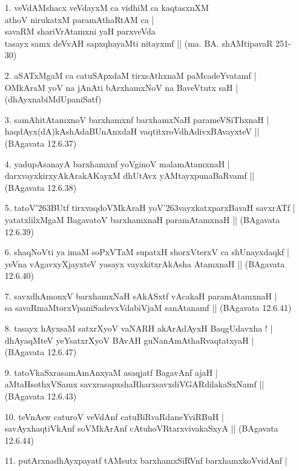 \begin{itemize}
\item[1.] veVdAMshacx veVdayxM ca vidhiM ca kaqtasxnXM\\\label{144}
athoV nirukatxM paramAthaRtAM ca |\\
savaRM shariVrAtamxni yaH parxveVda\\
tasayx samx deVvAH sapxqhayaMti nitayxmf ||
\hfill{(ma. BA. shAMtipavaR 251-30)}
\item[2.] aSATxMgaM ca catuSApxdaM tirxsAthxnaM paMcadeYvatamf |\\\label{144}
OMkAraM yoV na jAnAti bArxhamxNoV na BaveVtutx saH |
\hfill{(dhAyxnabiMdUpaniSatf)}
\item[3.] samAhitAtamxnoV barxhamxnf barxhamxNaH parameVSiThxnaH |\\\label{144}
haqdAyx(dA)kAshAdaBUnAnxdaH vaqtitxroVdhAdivxBAvayxteV ||
\hfill{(BAgavata 12.6.37)}
\item[4.] yadupAsanayA barxhamxnf yoVginoV malamAtamxnaH |\\
darxvayxkirxyAkArakAKayxM dhUtAvx yAMtayxpunaBaRvamf ||
\hfill{(BAgavata 12.6.38)}
\item[5.] tatoV\char'263BUtf tirxvaqdoVMkAraH yoV\char'263vayxkatxparxBavaH savxrATf |\\
yatatxlilxMgaM BagavatoV barxhamxnaH paramAtamxnaH ||
\hfill{(BAgavata 12.6.39)}
\item[6.] shaqNoVti ya imaM soPxVTaM supatxH shorxVterxV ca shUnayxdaqkf |\\
yeVna vAgavxyXjayxteV yasayx vayxkitxrAkAsha AtamxnaH ||
\hfill{(BAgavata 12.6.40)}
\item[7.] savxdhAmonxV barxhamxNaH sAkASxtf vAcakaH paramAtamxnaH |\\
sa savaRmaMtorxVpaniSadevxVdabiVjaM sanAtanamf ||
\hfill{(BAgavata 12.6.41)}
\item[8.] tasayx hAyxsaM satxrXyoV vaNARH akArAdAyxH BaqgUdavxha ! |\\
dhAyaqMteV yeYsatxrXyoV BAvAH guNanAmAthaRvaqtatxyaH |
\hfil{(BAgavata 12.6.47)}
\item[9.] tatoVkaSxrasamAmAnxyaM asaqjatf BagavAnf ajaH |\\
aMtaHsothxVSamx savxrasapxshaRharxsavxdiVGARdilakaSxNamf ||
\hfill{(BAgavata 12.6.43)}
\item[10.] teVnAsw caturoV veVdAnf catuBiRvaRdaneYviRBuH |\\
savAyxhaqtiVkAnf soVMkArAnf cAtuhoVRtarxvivakaSxyA ||
\hfill{(BAgavata 12.6.44)}
\item[11.] putArxnadhAyxpayatf tAMsutx barxhamxSiRVnf barxhamxkoVvidAnf |\\

\end{itemize}
